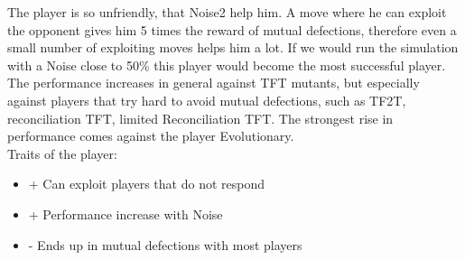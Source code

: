 The player is so unfriendly, that Noise2 help him. A move where he can exploit the opponent gives him 5 times the reward of mutual defections, therefore even a small number of exploiting moves helps him a lot. If we would run the simulation with a Noise close to 50\% this player would become the most successful player. The performance increases in general against TFT mutants, but especially against players that try hard to avoid mutual defections, such as TF2T, reconciliation TFT, limited Reconciliation TFT. The strongest rise in performance comes against the player Evolutionary. \\

Traits of the player:

\renewcommand{\labelitemi}{}

\begin{itemize}
	\item + Can exploit players that do not respond
	\item + Performance increase with Noise
	\item - Ends up in mutual defections with most players

\end{itemize}
\renewcommand{\labelitemi}{$\bullet$}

